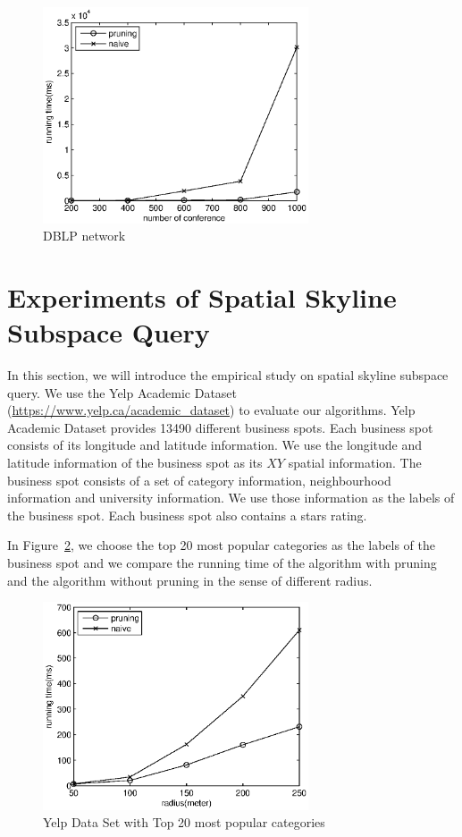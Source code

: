 \begin{figure}[H]
    \centering
      \includegraphics[width=0.7\textwidth]{figs/DBLP}
    \caption{DBLP network}
    \label{fig:exp:dblp}
\end{figure}

\section{Experiments of Spatial Skyline Subspace Query}
\label{ch:exp:spatial}
In this section, we will introduce the empirical study on spatial skyline subspace query. We use the Yelp Academic Dataset (\url{https://www.yelp.ca/academic_dataset}) to evaluate our algorithms. Yelp Academic Dataset provides 13490 different business spots. Each business spot consists of its longitude and latitude information. We use the longitude and latitude information of the business spot as its $XY$ spatial information. The business spot consists of a set of category information, neighbourhood information and university information. We use those information as the labels of the business spot. Each business spot also contains a stars rating.

In Figure~\ref{fig:exp:yelp20l}, we choose the top 20 most popular categories as the labels of the business spot and we compare the running time of the algorithm with pruning and the algorithm without pruning in the sense of different radius.

\begin{figure}[h]
    \centering
      \includegraphics[width=0.7\textwidth]{figs/YelpTop20Labels}
    \caption{Yelp Data Set with Top 20 most popular categories}
    \label{fig:exp:yelp20l}
\end{figure}


